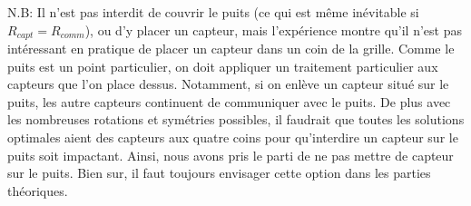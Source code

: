 \documentclass[12pt,a4paper]{article}
\begin{document}
N.B: Il n'est pas interdit de couvrir le puits (ce qui est même inévitable si $R_{capt}=R_{comm}$), ou d'y placer un capteur, mais l'expérience montre qu'il n'est pas intéressant en pratique de placer un capteur dans un coin de la grille. Comme le puits est un point particulier, on doit appliquer un traitement particulier aux capteurs que l'on place dessus.
 Notamment, si on enlève un capteur situé sur le puits, les autre capteurs continuent de communiquer avec le puits. De plus avec les nombreuses rotations et symétries possibles, il faudrait que toutes les solutions optimales aient des capteurs aux quatre coins pour qu'interdire un capteur sur le puits soit impactant. Ainsi, nous avons pris le parti de ne pas mettre de capteur sur le puits. Bien sur, il faut toujours envisager cette option dans les parties théoriques. 
\end{document}
